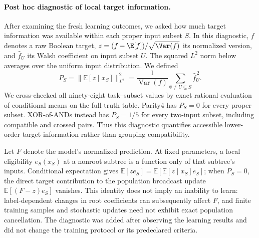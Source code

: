 \paragraph{Post hoc diagnostic of local target information.}
After examining the fresh learning outcomes, we asked how much target
information was available within each proper input subset $S$. In this
diagnostic, $f$ denotes a raw Boolean target, $z=(f-\E[f])/\sqrt{\Var(f)}$
its normalized version, and $\widehat f_U$ its Walsh coefficient on input
subset $U$. The squared $L^2$ norm below averages over the uniform input
distribution. We defined
\[
 P_S=\big\|\mathbb E[z\mid x_S]\big\|_{L^2}^2
 =\frac{1}{\operatorname{Var}(f)}
   \sum_{\emptyset\ne U\subseteq S}\widehat f_U^{\,2}.
\]
We cross-checked all ninety-eight task--subset values by exact rational
evaluation of conditional means on the full truth table. Parity4 has $P_S=0$
for every proper subset. XOR-of-ANDs instead has $P_S=1/5$ for every two-input
subset, including compatible and crossed pairs. Thus this diagnostic quantifies
accessible lower-order target information rather than grouping compatibility.

Let $F$ denote the model's normalized prediction. At fixed parameters, a
local eligibility $e_S(x_S)$ at a nonroot subtree is a
function only of that subtree's inputs. Conditional expectation gives
$\mathbb E[ze_S]=\mathbb E[\mathbb E[z\mid x_S]e_S]$; when $P_S=0$, the direct
target contribution to the population broadcast update
$\mathbb E[(F-z)e_S]$ vanishes. This identity does not imply an inability to
learn: label-dependent changes in root coefficients can subsequently affect
$F$, and finite training samples and stochastic updates need not exhibit exact
population cancellation. The diagnostic was added after observing the learning
results and did not change the training protocol or its predeclared criteria.

